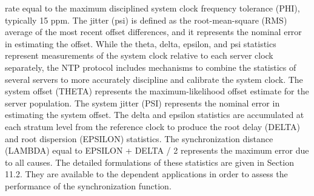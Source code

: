 rate equal to the maximum disciplined system clock frequency
 tolerance (PHI), typically 15 ppm. The jitter (psi) is defined as
 the root-mean-square (RMS) average of the most recent offset
 differences, and it represents the nominal error in estimating the
 offset.
 While the theta, delta, epsilon, and psi statistics represent
 measurements of the system clock relative to each server clock
 separately, the NTP protocol includes mechanisms to combine the
 statistics of several servers to more accurately discipline and
 calibrate the system clock. The system offset (THETA) represents the
 maximum-likelihood offset estimate for the server population. The
 system jitter (PSI) represents the nominal error in estimating the
 system offset. The delta and epsilon statistics are accumulated at
 each stratum level from the reference clock to produce the root delay
 (DELTA) and root dispersion (EPSILON) statistics. The
 synchronization distance (LAMBDA) equal to EPSILON + DELTA / 2
 represents the maximum error due to all causes. The detailed
formulations of these statistics are given in Section 11.2. They are
 available to the dependent applications in order to assess the
 performance of the synchronization function.
